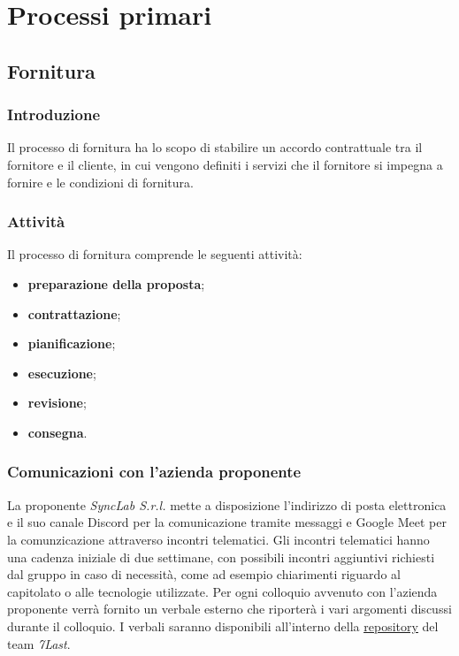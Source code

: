 \section{Processi primari}
\subsection{Fornitura}
\subsubsection{Introduzione}
Il processo di fornitura ha lo scopo di stabilire un accordo contrattuale tra il fornitore e il cliente, in cui vengono definiti i servizi che il fornitore si impegna a fornire e le condizioni di fornitura.
\subsubsection{Attività}
Il processo di fornitura comprende le seguenti attività:
\begin{itemize}
	\item \textbf{preparazione della proposta};
	\item \textbf{contrattazione};
	\item \textbf{pianificazione};
	\item \textbf{esecuzione};
	\item \textbf{revisione};
	\item \textbf{consegna}.
\end{itemize}

\subsubsection{Comunicazioni con l'azienda proponente}
La proponente \textit{SyncLab S.r.l.} mette a disposizione l'indirizzo di posta elettronica e il suo canale Discord per la comunicazione tramite messaggi e Google Meet per la comunzicazione attraverso incontri telematici.
Gli incontri telematici hanno una cadenza iniziale di due settimane, con possibili incontri aggiuntivi richiesti dal gruppo in caso di necessità, come ad esempio chiarimenti riguardo al capitolato o alle tecnologie utilizzate.
Per ogni colloquio avvenuto con l'azienda proponente verrà fornito un verbale esterno che riporterà i vari argomenti discussi durante il colloquio.
I verbali saranno disponibili all'interno della \href{https://github.com/7Last/docs}{\underline{repository}} del team \textit{7Last}.
\newpage

